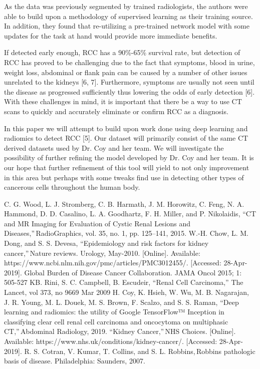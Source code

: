 \documentclass[10pt,journal,compsoc]{IEEEtran}
\begin{document}
As the data was previously segmented by trained radiologists, the authors were able to build upon a methodology of supervised learning as their training source. In addition, they found that re-utilizing a pre-trained network model with some updates for the task at hand would provide more immediate benefits.

If detected early enough, RCC has a 90\%-65\% survival rate, but detection of RCC has proved to be challenging due to the fact that symptoms, blood in urine, weight loss, abdominal or flank pain can be caused by a number of other issues unrelated to the kidneys [6, 7]. Furthermore, symptoms are usually not seen until the disease as progressed sufficiently thus lowering the odds of early detection [6].  With these challenges in mind, it is important that there be a way to use CT scans to quickly and accurately eliminate or confirm RCC as a diagnosis.  

In this paper we will attempt to build upon work done using deep learning and radiomics to detect RCC [5].  Our dataset will primarily consist of the same CT derived datasets used by Dr. Coy and her team.  We will investigate the possibility of further refining the model developed by Dr. Coy and her team. It is our hope that further refinement of this tool will yield to not only improvement in this area but perhaps with some tweaks find use in detecting other types of cancerous cells throughout the human body.  



\cleardoublepage



\begin{thebibliography}{00}
 C. G. Wood, L. J. Stromberg, C. B. Harmath, J. M. Horowitz, C. Feng, N. A. Hammond, D. D. Casalino, L. A. Goodhartz, F. H. Miller, and P. Nikolaidis, “CT and MR Imaging for Evaluation of Cystic Renal Lesions and Diseases,” RadioGraphics, vol. 35, no. 1, pp. 125–141, 2015. 
 W.-H. Chow, L. M. Dong, and S. S. Devesa, “Epidemiology and risk factors for kidney cancer,” Nature reviews. Urology, May-2010. [Online]. Available: https://www.ncbi.nlm.nih.gov/pmc/articles/PMC3012455/. [Accessed: 28-Apr-2019]. 
 Global Burden of Disease Cancer Collaboration. JAMA Oncol 2015; 1: 505-527 
 KB. Rini, S. C. Campbell, B. Escudeir, “Renal Cell Carcinoma,” The Lancet, vol 373, no 9669 Mar 2009 
 H. Coy, K. Hsieh, W. Wu, M. B. Nagarajan, J. R. Young, M. L. Douek, M. S. Brown, F. Scalzo, and S. S. Raman, “Deep learning and radiomics: the utility of Google TensorFlow™ Inception in classifying clear cell renal cell carcinoma and oncocytoma on multiphasic CT,” Abdominal Radiology, 2019. 
 “Kidney Cancer,” NHS Choices. [Online]. Available: https://www.nhs.uk/conditions/kidney-cancer/. [Accessed: 28-Apr-2019]. 
 R. S. Cotran, V. Kumar, T. Collins, and S. L. Robbins, Robbins pathologic basis of disease. Philadelphia: Saunders, 2007. 
\end{thebibliography}


\end{document}
